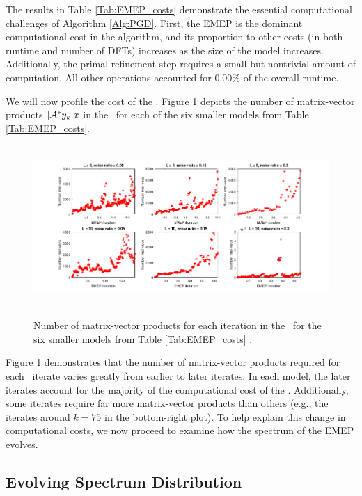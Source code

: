 The results in Table \ref{Tab:EMEP_costs} demonstrate the essential computational challenges of Algorithm \ref{Alg:PGD}.  First, the EMEP is the dominant computational cost in the algorithm, and its proportion to other costs (in both runtime and number of DFTs) increases as the size of the model increases.  Additionally, the primal refinement step requires a small but nontrivial amount of computation.  All other operations accounted for $0.00\%$ of the overall runtime. 



We will now profile the cost of the \emep.
Figure \ref{Fig:EMEP_costs_num_mat_vecs} depicts the number of matrix-vector products $[{\mathcal A}^*y_k]x$ in the \emep \ for each of the six smaller models from Table \ref{Tab:EMEP_costs}. 

\begin{figure}[H]
\centering
\hbox{\hspace{-1.9cm} \includegraphics[scale=0.6]{EMEP_costs_num_mat_vecs} }\vspace{-0.4cm}
	\caption{Number of matrix-vector products for each iteration in the \emep \ for the six smaller models from Table \ref{Tab:EMEP_costs}	.}
\label{Fig:EMEP_costs_num_mat_vecs}
\end{figure}

Figure \ref{Fig:EMEP_costs_num_mat_vecs} demonstrates that the number of matrix-vector products required for each \emep \ iterate varies greatly from earlier to later iterates.  
In each model, the later iterates account for the majority of the computational cost of the \emep.  
Additionally, some iterates require far more matrix-vector products than others (e.g., the iterates around $k=75$ in the bottom-right plot).
To help explain this change in computational costs, we now proceed to examine how the spectrum of the EMEP evolves.



\subsection{Evolving Spectrum Distribution} 	\label{Subsubsec:evol_mats-EMEP_spectrum_and_clustering}


